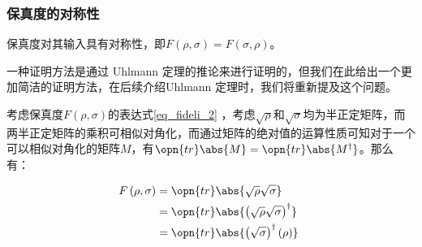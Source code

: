 \subsubsection{保真度的对称性}

保真度对其输入具有对称性，即$F\left(\rho,\sigma\right) = F\left(\sigma,\rho\right)$。

一种证明方法是通过 Uhlmann 定理的推论来进行证明的，但我们在此给出一个更加简洁的证明方法，在后续介绍Uhlmann 定理时，我们将重新提及这个问题。 

考虑保真度$F\left(\rho,\sigma\right)$的表达式\autoref{eq_fideli_2} ，考虑$\sqrt{\rho}$和$\sqrt{\sigma}$均为半正定矩阵，而两半正定矩阵的乘积可相似对角化，而通过矩阵的绝对值的运算性质可知对于一个可以相似对角化的矩阵$M$，有$\opn{tr}\abs{M} = \opn{tr}\abs{M^\dagger}$。那么有：

\begin{equation}
\begin{aligned}
F\left(\rho,\sigma\right) &= \opn{tr}\abs{\sqrt{\rho}\sqrt{\sigma}} \\
&= \opn{tr}\abs{\left(\sqrt{\rho}\sqrt{\sigma}\right)^\dagger} \\
&= \opn{tr}\abs{\left(\sqrt{\sigma}\right)^\dagger\left(\rho\right)}
\end{aligned}~
\end{equation}

